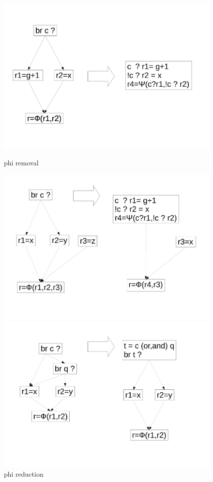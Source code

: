 \begin{figure}
\begin{minipage}[t]{5cm}
\includegraphics[scale=0.2]{phi_removal.pdf}
\caption{phi removal}
\label{fig:phi_rem}
\end{minipage}
\begin{minipage}[t]{5cm}
\includegraphics[scale=0.2]{phi_reduction.pdf}
\caption{phi reduction}
\label{fig:phi_red}
\end{minipage}
\begin{minipage}[t]{6cm}
\includegraphics[scale=0.2]{phi_merge.pdf}

\end{minipage}
\end{figure}
